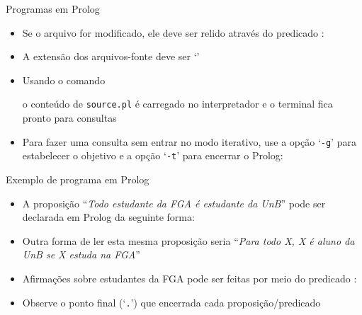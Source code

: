 \begin{frame}[fragile]{Programas em Prolog}

    \begin{itemize}
        \item Se o arquivo for modificado, ele deve ser relido através do predicado 
            :


        \item A extensão dos arquivos-fonte deve ser `'

        \item Usando o comando


        o conteúdo de \texttt{source.pl} é carregado no interpretador e o terminal fica 
        pronto para consultas

        \item Para fazer uma consulta sem entrar no modo iterativo, use a opção `\texttt{-g}'
            para estabelecer o objetivo e a opção `\texttt{-t}' para encerrar o Prolog:


    \end{itemize}

\end{frame}

\begin{frame}[fragile]{Exemplo de programa em Prolog}

    \begin{itemize}
        \item A proposição ``\textit{Todo estudante da FGA é estudante da UnB}'' pode
            ser declarada em Prolog da seguinte forma:


        \item Outra forma de ler esta mesma proposição seria ``\textit{Para todo X, X é aluno               da UnB se X estuda na FGA}''

        \item Afirmações sobre estudantes da FGA pode ser feitas por meio do predicado
            :

    
        \item Observe o ponto final (`\texttt{.}') que encerrada cada proposição/predicado

    \end{itemize}

\end{frame}

